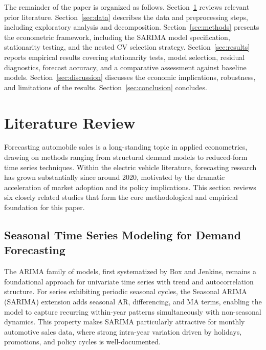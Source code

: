 \documentclass[12pt]{article}
\begin{document}
The remainder of the paper is organized as follows. Section~\ref{sec:lit} reviews relevant prior literature. Section~\ref{sec:data} describes the data and preprocessing steps, including exploratory analysis and decomposition. Section~\ref{sec:methods} presents the econometric framework, including the SARIMA model specification, stationarity testing, and the nested CV selection strategy. Section~\ref{sec:results} reports empirical results covering stationarity tests, model selection, residual diagnostics, forecast accuracy, and a comparative assessment against baseline models. Section~\ref{sec:discussion} discusses the economic implications, robustness, and limitations of the results. Section~\ref{sec:conclusion} concludes.

\section{Literature Review}
\label{sec:lit}

Forecasting automobile sales is a long-standing topic in applied econometrics, drawing on methods ranging from structural demand models to reduced-form time series techniques. Within the electric vehicle literature, forecasting research has grown substantially since around 2020, motivated by the dramatic acceleration of market adoption and its policy implications. This section reviews six closely related studies that form the core methodological and empirical foundation for this paper.

\subsection{Seasonal Time Series Modeling for Demand Forecasting}

The ARIMA family of models, first systematized by Box and Jenkins, remains a foundational approach for univariate time series with trend and autocorrelation structure. For series exhibiting periodic seasonal cycles, the Seasonal ARIMA (SARIMA) extension adds seasonal AR, differencing, and MA terms, enabling the model to capture recurring within-year patterns simultaneously with non-seasonal dynamics. This property makes SARIMA particularly attractive for monthly automotive sales data, where strong intra-year variation driven by holidays, promotions, and policy cycles is well-documented.
\end{document}
